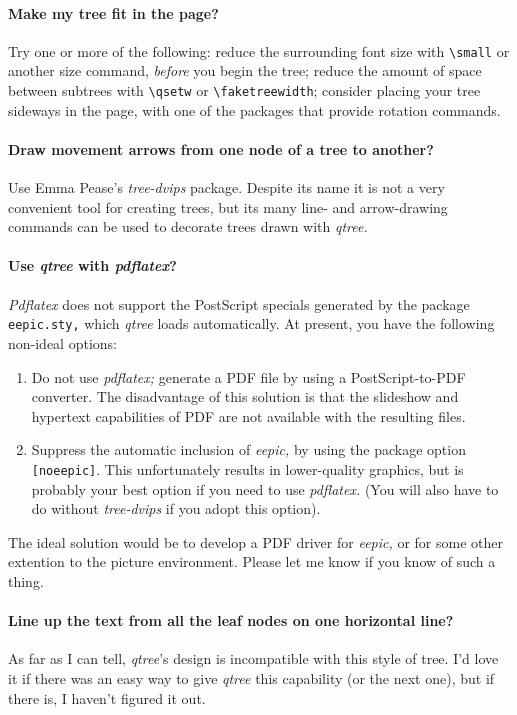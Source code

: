 \documentclass[11pt]{article}
\begin{document}
\paragraph{Make my tree fit in the page?}  Try one or more of the following:
reduce the surrounding font size with \verb|\small| or another size command,
\emph{before} you begin the tree; reduce the amount of space between subtrees
with \verb|\qsetw| or \verb|\faketreewidth|; consider placing your tree
sideways in the page, with one of the packages that provide rotation commands.

\paragraph{Draw movement arrows from one node of a tree to another?}
Use Emma Pease's \emph{tree-dvips} package.  Despite its name it is not a very
convenient tool for creating trees, but its many line- and
arrow-drawing commands can be used to decorate trees drawn with \emph{qtree.} 


\paragraph{Use \emph{qtree} with \emph{pdflatex}?}

\emph{Pdflatex} does not support the PostScript specials generated by the
package \texttt{eepic.sty,} which \emph{qtree} loads automatically.
At present, you have the following non-ideal options:
\begin{enumerate}
\item Do not use \emph{pdflatex;}  generate a PDF file by using a
PostScript-to-PDF converter.  The disadvantage of this solution is that the 
slideshow and hypertext capabilities of PDF are not available with the
resulting files.
\item Suppress the automatic inclusion of \emph{eepic,} by using the package
option \texttt{[noeepic]}.  This unfortunately results in lower-quality
graphics, but is probably your best option if you need to use \emph{pdflatex.} 
(You will also have to do without \emph{tree-dvips} if you adopt this option).
\end{enumerate}
The ideal solution would be to develop a PDF driver for \emph{eepic,} or for
some other extention to the picture environment.  Please let me know if you
know of such a thing. 

\paragraph{Line up the text from all the leaf nodes on one horizontal line?}
As far as I can tell, \emph{qtree}'s design is incompatible with this style of
tree.  I'd love it if there was an easy way to give {\it qtree\/} this
capability (or the next one), but if there is, I haven't figured it out.
\end{document}

